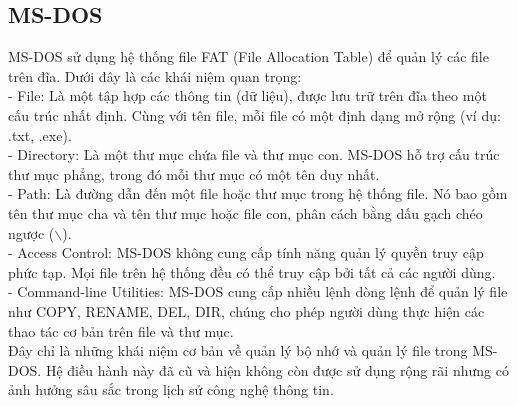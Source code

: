 \documentclass[12pt,a4paper]{article}
\begin{document}
\subsection{MS-DOS}
MS-DOS sử dụng hệ thống file FAT (File Allocation Table) để quản lý các file trên đĩa. Dưới đây là các khái niệm quan trọng:\\

- File: Là một tập hợp các thông tin (dữ liệu), được lưu trữ trên đĩa theo một cấu trúc nhất định. Cùng với tên file, mỗi file có một định dạng mở rộng (ví dụ: .txt, .exe).\\

- Directory: Là một thư mục chứa file và thư mục con. MS-DOS hỗ trợ cấu trúc thư mục phẳng, trong đó mỗi thư mục có một tên duy nhất.\\

- Path: Là đường dẫn đến một file hoặc thư mục trong hệ thống file. Nó bao gồm tên thư mục cha và tên thư mục hoặc file con, phân cách bằng dấu gạch chéo ngược ($\backslash$).\\

- Access Control: MS-DOS không cung cấp tính năng quản lý quyền truy cập phức tạp. Mọi file trên hệ thống đều có thể truy cập bởi tất cả các người dùng.\\

- Command-line Utilities: MS-DOS cung cấp nhiều lệnh dòng lệnh để quản lý file như COPY, RENAME, DEL, DIR, chúng cho phép người dùng thực hiện các thao tác cơ bản trên file và thư mục.\\

Đây chỉ là những khái niệm cơ bản về quản lý bộ nhớ và quản lý file trong MS-DOS. Hệ điều hành này đã cũ và hiện không còn được sử dụng rộng rãi nhưng có ảnh hưởng sâu sắc trong lịch sử công nghệ thông tin.
\end{document}
